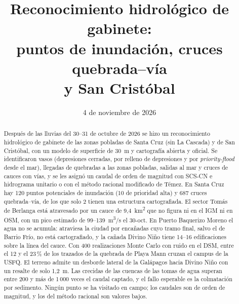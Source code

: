 \documentclass{sosg-informe}
\title{Reconocimiento hidrológico de gabinete:\\puntos de inundación, cruces quebrada--vía\\y San Cristóbal}
\date{4 de noviembre de 2026}
\newcommand{\kmc}{km\textsuperscript{2}}
\newcommand{\mcs}{m\textsuperscript{3}/s}
\begin{document}
\maketitle

\begin{abstract}
Después de las lluvias del 30--31 de octubre de 2026 se hizo un reconocimiento hidrológico de gabinete de las zonas pobladas de Santa Cruz (sin La Cascada) y de San Cristóbal, con un modelo de superficie de 30~m y cartografía abierta y oficial. Se identificaron vasos (depresiones cerradas, por relleno de depresiones y por \emph{priority-flood} desde el mar), llegadas de quebradas a las zonas pobladas, salidas al mar y cruces de cauces con vías, y se les asignó un caudal de orden de magnitud con SCS-CN e hidrograma unitario o con el método racional modificado de Témez. En Santa Cruz hay 120 puntos potenciales de inundación (10 de prioridad alta) y 687 cruces quebrada--vía, de los que solo 2 tienen una estructura cartografiada. El sector Tomás de Berlanga está atravesado por un cauce de 9,4~\kmc{} que no figura ni en el IGM ni en OSM, con un pico estimado de 99--139~\mcs{} el 30-oct. En Puerto Baquerizo Moreno el agua no se acumula: atraviesa la ciudad por encañadas cuyo tramo final, salvo el de Barrio Frío, no está cartografiado, y la cañada Divino Niño tiene 14--16 edificaciones sobre la línea del cauce. Con 400 realizaciones Monte Carlo con ruido en el DSM, entre el 12 y el 23\,\% de los trazados de la quebrada de Playa Mann cruzan el campus de la USFQ. El terreno admite un desborde lateral de la Galápagos hacia Divino Niño con un resalte de solo 1,2~m. Las crecidas de las cuencas de las tomas de agua superan entre 200 y más de 1\,000 veces el caudal captado, y el fallo esperable es la colmatación por sedimento. Ningún punto se ha visitado en campo; los caudales son de orden de magnitud, y los del método racional son valores bajos.
\end{abstract}
\end{document}
